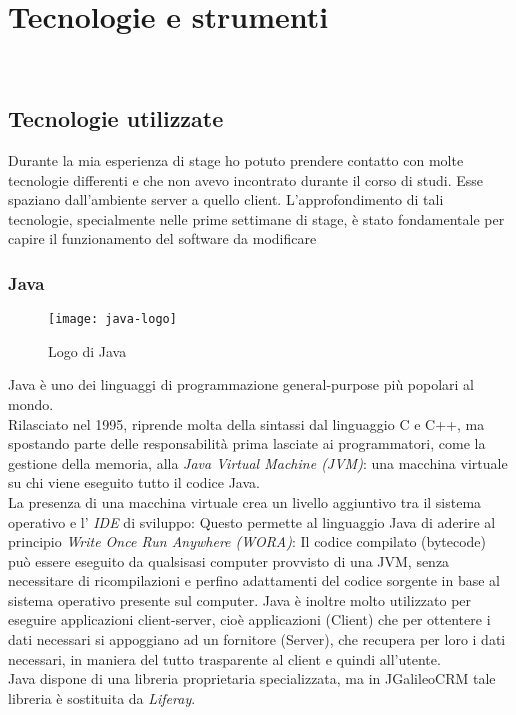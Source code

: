 \chapter{Tecnologie e strumenti}
\label{cap:tecnologie-strumenti}

\\

\section{Tecnologie utilizzate}
Durante la mia esperienza di stage ho potuto prendere contatto con molte tecnologie differenti e che non avevo incontrato durante il corso di studi. Esse spaziano dall'ambiente server a quello client. L'approfondimento di tali tecnologie, specialmente nelle prime settimane di stage, è stato fondamentale per capire il funzionamento del software da modificare \\
\subsection{Java}
\begin{figure}[h]
	\centering
	\texttt{[image: java-logo]}
	\caption{Logo di Java}
\end{figure}
Java è uno dei linguaggi di programmazione general-purpose più popolari al mondo. \\
Rilasciato nel 1995, riprende molta della sintassi dal linguaggio C e C++, ma spostando parte delle responsabilità prima lasciate ai programmatori, come la gestione della memoria, alla \emph{Java Virtual Machine (JVM)}: una macchina virtuale su chi viene eseguito tutto il codice Java.\\
La presenza di una macchina virtuale crea un livello aggiuntivo tra il sistema operativo e l' \emph{IDE} di sviluppo: Questo permette al linguaggio Java di aderire al principio \emph{Write Once Run Anywhere (WORA)}: Il codice compilato (bytecode) può essere eseguito da qualsisasi computer provvisto di una JVM, senza necessitare di ricompilazioni e perfino adattamenti del codice sorgente in base al sistema operativo presente sul computer.
Java è inoltre molto utilizzato per eseguire applicazioni client-server, cioè applicazioni (Client) che per ottentere i dati necessari si appoggiano ad un fornitore (Server), che recupera per loro i dati necessari, in maniera del tutto trasparente al client e quindi all'utente.\\
Java dispone di una libreria proprietaria specializzata, ma in JGalileoCRM tale libreria è sostituita da \emph{Liferay}.\\ %
